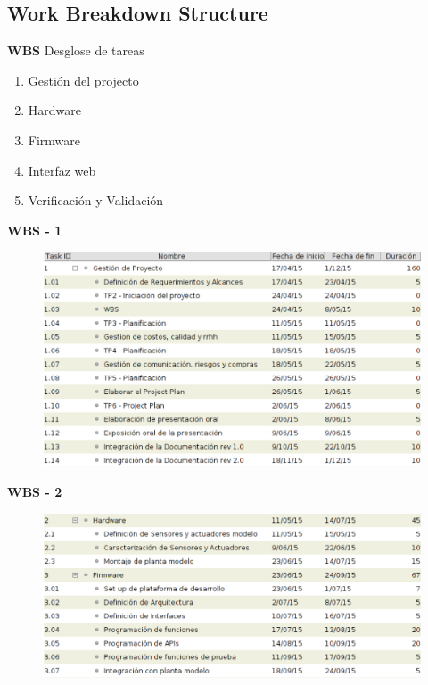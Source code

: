 \documentclass{beamer}
\begin{document}
\subsection[WBS]{Work Breakdown Structure}

\begin{frame}{\textbf{WBS} Desglose de tareas}
\fontsize{14pt}{15}\selectfont
	\begin{enumerate}
		\item Gestión del projecto
		\vspace{10px}
		\item Hardware
		\vspace{10px}
		\item Firmware
		\vspace{10px}
		\item Interfaz web
		\vspace{10px}
		\item Verificación y Validación
		\vspace{10px}
	\end{enumerate}
\end{frame}


\begin{frame}{\textbf{WBS - 1}}
\fontsize{14pt}{15}\selectfont
\begin{figure}[H]
	  	{\includegraphics[width=1\textwidth]{./imagenes/wbs1.png}}
	\end{figure}	
\end{frame}

\begin{frame}{\textbf{WBS - 2}}
\fontsize{14pt}{15}\selectfont
\begin{figure}[H]
	  	{\includegraphics[width=1\textwidth]{./imagenes/wbs2.png}}
	\end{figure}	
\end{frame}
\end{document}
